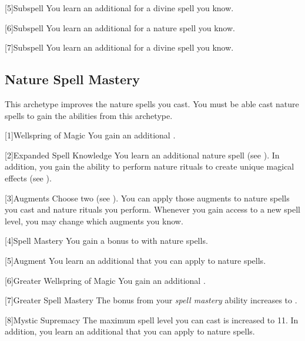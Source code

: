         [5]{Subspell}
        You learn an additional  for a divine spell you know.

        [6]{Subspell}
        You learn an additional  for a nature spell you know.

        [7]{Subspell}
        You learn an additional  for a divine spell you know.

    \subsection{Nature Spell Mastery}
        This archetype improves the nature spells you cast.
        You must be able cast nature spells to gain the abilities from this archetype.

        [1]{Wellspring of Magic}
        You gain an additional .

        [2]{Expanded Spell Knowledge}
        You learn an additional nature spell (see ).
        In addition, you gain the ability to perform nature rituals to create unique magical effects (see ).

        [3]{Augments}
        Choose two  (see ).
        You can apply those augments to nature spells you cast and nature rituals you perform.
        Whenever you gain access to a new spell level, you may change which augments you know.

        [4]{Spell Mastery}
        You gain a  bonus to  with nature spells.

        [5]{Augment}
        You learn an additional  that you can apply to nature spells.

        [6]{Greater Wellspring of Magic}
        You gain an additional .

        [7]{Greater Spell Mastery} 
        The bonus from your \textit{spell mastery} ability increases to .

        [8]{Mystic Supremacy}
        The maximum spell level you can cast is increased to 11.
        In addition, you learn an additional  that you can apply to nature spells.

